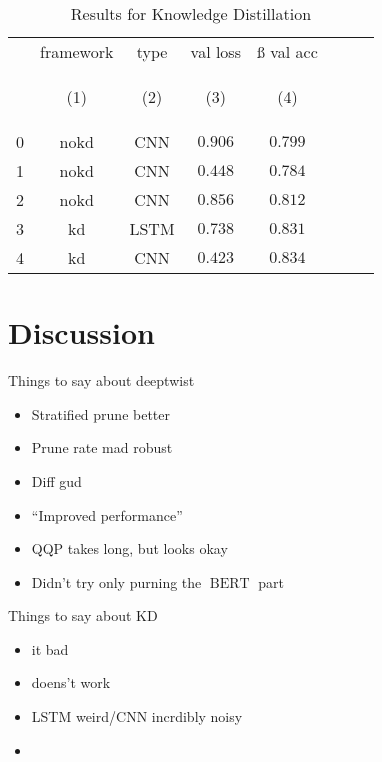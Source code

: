 \documentclass[10pt]{article}
\newcommand{\bert}{\operatorname{BERT}}
\begin{document}



\begin{table}[tbh]
        \caption{Results for Knowledge Distillation}
        \label{tab:kd_results}
        \centering
        \vspace{1em}
        \begin{tabular}{lccccccc}
\toprule
{} &  framework &  type &  val loss &  ß val acc \\
{} & \hypertarget{tabcol:1}{(1)} & \hypertarget{tabcol:2}{(2)} & \hypertarget{tabcol:3}{(3)} & \hypertarget{tabcol:4}{(4)} \\
\midrule
0 &        nokd &   CNN &   $0.906$ &   $0.799$ \\
1 &        nokd &   CNN &   $0.448$ &   $0.784$ \\
2 &        nokd &   CNN &   $0.856$ &   $0.812$ \\
3 &          kd &  LSTM &   $0.738$ &   $0.831$ \\
4 &          kd &   CNN &   $0.423$ &   $0.834$ \\
\bottomrule
\end{tabular}

\end{table}

\section{Discussion}
Things to say about deeptwist
\begin{itemize}
  \item Stratified prune better
  \item Prune rate mad robust
  \item Diff gud
  \item ``Improved performance''
  \item QQP takes long, but looks okay
  \item Didn't try only purning the $\bert$ part
\end{itemize}

Things to say about KD
\begin{itemize}
  \item it bad
  \item doens't work
  \item LSTM weird/CNN incrdibly noisy
  \item {}
\end{itemize}
\end{document}

